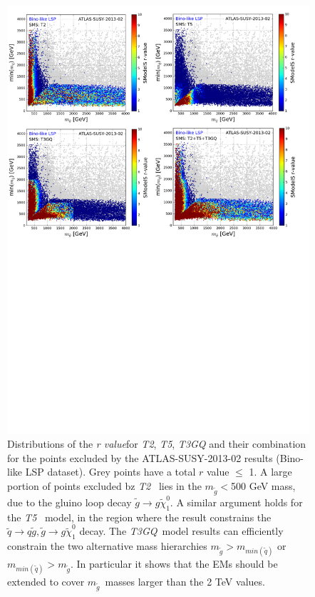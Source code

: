 \documentclass[a4paper,11pt]{article}
\newcommand{\MGLU}{$ m _{ \tilde g } $\xspace}
\newcommand{\RVALUE}{\textit{r value}}
\newcommand{\TGQ}{ \textit{T3GQ}}
\newcommand{\Ttwo}{ \textit{T2}}
\newcommand{\Tfive}{ \textit{T5}}
\begin{document}
\begin{figure}[!h]
	\begin{center}
		\includegraphics[width=1\textwidth]{PLOTS/App/Bino_Combo.pdf}
	\end{center}
	\vspace{0.2pt}
	\caption{Distributions of the \RVALUE for \textit{T2}, \textit{T5}, \textit{T3GQ} and their combination for the points excluded by the ATLAS-SUSY-2013-02 results (Bino-like LSP dataset). Grey points have a total $r$ value $\leq$ 1. A large portion of points excluded bz \Ttwo~ lies in the $m_{\tilde g}<$500 GeV mass, due to the gluino loop decay $\tilde g \rightarrow g \tilde \chi _1 ^0$. A similar argument holds for the \Tfive~ model, in the region where the result constrains the $\tilde q \rightarrow q \tilde g, \tilde g \rightarrow  g \tilde \chi _1 ^0$ decay. The \TGQ~model results can efficiently constrain the two alternative mass hierarchies $m_{\tilde g}>m_{min(\tilde q)}$ or $m_{min(\tilde q)}>m_{\tilde g }$. In particular it shows that the EMs should be extended to cover \MGLU~masses larger than the 2 TeV values.}
	\label{rvalues-bino}
\end{figure}
\end{document}
